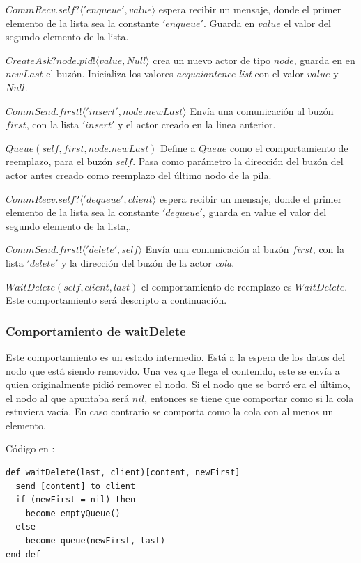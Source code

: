 \begin{description}
 \item $CommRecv.self? \langle 'enqueue', value \rangle$ espera recibir un mensaje, donde el primer elemento de la lista sea la constante $'enqueue'$. Guarda en $value$ el valor del segundo elemento de la lista.
 \item $CreateAsk?node.pid!\langle value, Null \rangle$ crea un nuevo actor de tipo $node$, guarda en en $newLast$ el buzón. Inicializa los valores \textit{acquaiantence-list} con el valor $value$ y $Null$.
 \item $CommSend.first!\langle 'insert', node.newLast \rangle$ Envía una comunicación al buzón $first$, con la lista $'insert'$ y el actor creado en la linea anterior. 
 \item $Queue(self, first, node.newLast)$ Define a $Queue$ como el comportamiento de reemplazo, para el buzón $self$. Pasa como parámetro la dirección del buzón del actor antes creado como reemplazo del último nodo de la pila.
 \item $CommRecv.self?\langle 'dequeue', client \rangle$ espera recibir un mensaje, donde el primer elemento de la lista sea la constante $'dequeue'$, guarda en value el valor del segundo elemento de la lista,.
 \item $CommSend.first!\langle 'delete', self \rangle$ Envía una comunicación al buzón $first$, con la lista $'delete'$ y la dirección del buzón de la actor \textit{cola}. 
 \item $WaitDelete(self, client, last)$ el comportamiento de reemplazo es $WaitDelete$. Este comportamiento será descripto a continuación.
 \end{description}

\subsubsection*{Comportamiento de waitDelete}
Este comportamiento es un estado intermedio. Está a la espera de los datos del nodo que está siendo removido. Una vez que llega el contenido, este se envía a quien originalmente pidió remover el nodo. Si el nodo que se borró era el último, el nodo al que apuntaba será $nil$, entonces se tiene que comportar como si la cola estuviera vacía. En caso contrario se comporta como la cola con al menos un elemento.

Código en \SAL:

\begin{lstlisting}[language=sal, style=simple]
def waitDelete(last, client)[content, newFirst]
  send [content] to client
  if (newFirst = nil) then
    become emptyQueue()
  else
    become queue(newFirst, last)
end def
\end{lstlisting}


